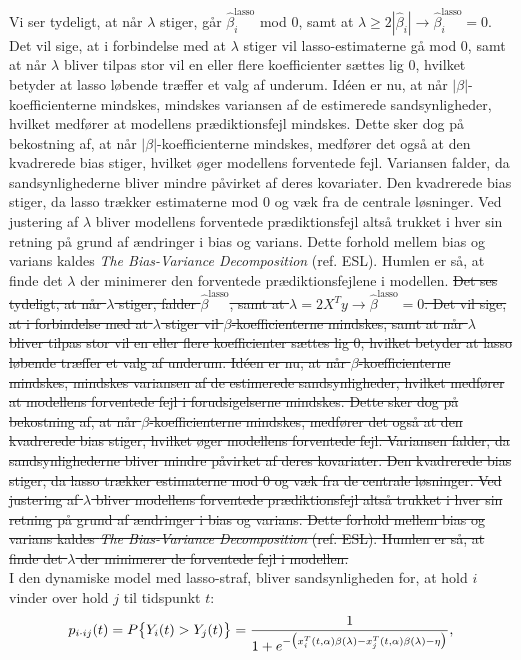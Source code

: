 \documentclass[11pt,a4paper]{article}
\begin{document}
Vi ser tydeligt, at når $\lambda$ stiger, går $\hat{\beta}_i^{\text{lasso}}$ mod 0, samt at $\lambda\geq2|\hat{\beta}_i|\rightarrow \hat{\beta}_i^{\text{lasso}}=0$. Det vil sige, at i forbindelse med at $\lambda$ stiger vil lasso-estimaterne gå mod 0, samt at når $\lambda$ bliver tilpas stor vil en eller flere koefficienter sættes lig 0, hvilket betyder at lasso løbende træffer et valg af underum. Idéen er nu, at når $|\beta|$-koefficienterne mindskes, mindskes variansen af de estimerede sandsynligheder, hvilket medfører at modellens prædiktionsfejl mindskes. Dette sker dog på bekostning af, at når $|\beta|$-koefficienterne mindskes, medfører det også at den kvadrerede bias stiger, hvilket øger modellens forventede fejl. Variansen falder, da sandsynlighederne bliver mindre påvirket af deres kovariater. Den kvadrerede bias stiger, da lasso trækker estimaterne mod 0 og væk fra de centrale løsninger. Ved justering af $\lambda$ bliver modellens forventede prædiktionsfejl altså trukket i hver sin retning på grund af ændringer i bias og varians. Dette forhold mellem bias og varians kaldes \textit{The Bias-Variance Decomposition} (ref. ESL). Humlen er så, at finde det $\lambda$ der minimerer den forventede prædiktionsfejlene i modellen.
\sout{
Det ses tydeligt, at når $\lambda$ stiger, falder $\hat{\beta}^{\text{lasso}}$, samt at $\lambda=2X^Ty\rightarrow \hat{\beta}^{\text{lasso}}=0$. Det vil sige, at i forbindelse med at $\lambda$ stiger vil $\beta$-koefficienterne mindskes, samt at når $\lambda$ bliver tilpas stor vil en eller flere koefficienter sættes lig 0, hvilket betyder at lasso løbende træffer et valg af underum. Idéen er nu, at når $\beta$-koefficienterne mindskes, mindskes variansen af de estimerede sandsynligheder, hvilket medfører at modellens forventede fejl i forudsigelserne mindskes. Dette sker dog på bekostning af, at når $\beta$-koefficienterne mindskes, medfører det også at den kvadrerede bias stiger, hvilket øger modellens forventede fejl. Variansen falder, da sandsynlighederne bliver mindre påvirket af deres kovariater. Den kvadrerede bias stiger, da lasso trækker estimaterne mod 0 og væk fra de centrale løsninger. Ved justering af $\lambda$ bliver modellens forventede prædiktionsfejl altså trukket i hver sin retning på grund af ændringer i bias og varians. Dette forhold mellem bias og varians kaldes \textit{The Bias-Variance Decomposition} (ref. ESL). Humlen er så, at finde det $\lambda$ der minimerer de forventede fejl i modellen.}\\ 
I den dynamiske model med lasso-straf, bliver sandsynligheden for, at hold $i$ vinder over hold $j$ til tidspunkt $t$:\\
\begin{align}
    p_{i\cdot ij}(t)=P\big{\{}Y_{i}(t)>Y_{j}(t)\big{\}}=\frac{1}{1+e^{-\big{(}x_i^T(t,\alpha)\beta(\lambda)-x_j^T(t,\alpha)\beta(\lambda)-\eta\big{)}}},
\end{align}
\end{document}
